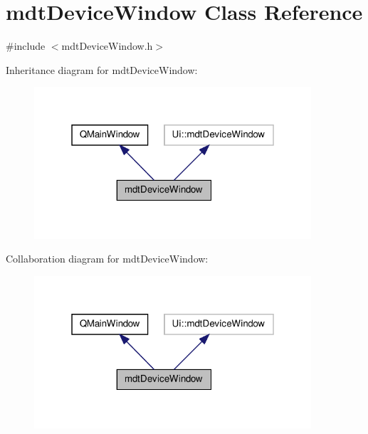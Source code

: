 \hypertarget{classmdt_device_window}{\section{mdt\-Device\-Window Class Reference}
\label{classmdt_device_window}
}


{\ttfamily \#include $<$mdt\-Device\-Window.\-h$>$}



Inheritance diagram for mdt\-Device\-Window\-:\nopagebreak
\begin{figure}[H]
\begin{center}
\leavevmode
\includegraphics[width=292pt]{classmdt_device_window__inherit__graph}
\end{center}
\end{figure}


Collaboration diagram for mdt\-Device\-Window\-:\nopagebreak
\begin{figure}[H]
\begin{center}
\leavevmode
\includegraphics[width=292pt]{classmdt_device_window__coll__graph}
\end{center}
\end{figure}
